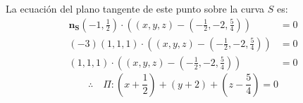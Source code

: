 \begin{solution}
La ecuación del plano tangente de este punto sobre la curva $S$ es:
\begin{align*}
    \boldsymbol{n_{S}}\left(-1,\frac{1}{2}\right)\cdot \left((x,y,z)-\left(-\frac{1}{2},-2,\frac{5}{4}\right)\right) &= 0 \\
    (-3)(1,1,1)\cdot \left((x,y,z)-\left(-\frac{1}{2},-2,\frac{5}{4}\right)\right) &= 0\\
    (1,1,1)\cdot \left((x,y,z)-\left(-\frac{1}{2},-2,\frac{5}{4}\right)\right) &= 0
\end{align*}
\begin{equation}
    \therefore \quad \Pi : \left(x+\frac{1}{2}\right)+(y+2)+\left(z-\frac{5}{4}\right)=0
\end{equation}

\end{solution}


